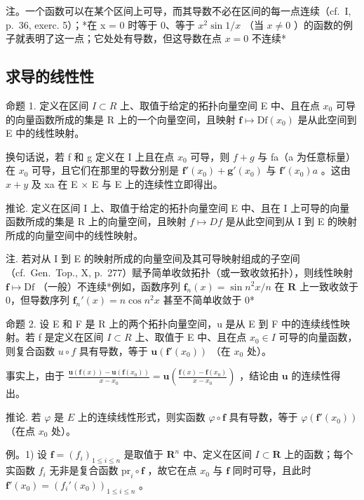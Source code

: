 注。一个函数可以在某个区间上可导，而其导数不必在区间的每一点连续（cf.~I, p.~36, exerc. 5）；*在 x = 0 时等于 0、等于 \(x^{2} \sin 1/x\) （当 \(x \neq 0\) ）的函数的例子就表明了这一点；它处处有导数，但这导数在点 \(x = 0\) 不连续*

\subsection{求导的线性性}

命题 1. 定义在区间 \(I \subset R\) 上、取值于给定的拓扑向量空间 E 中、且在点 \(x_{0}\) 可导的向量函数所成的集是 R 上的一个向量空间，且映射 \(\mathbf{f} \mapsto \mathrm{Df}(x_{0})\) 是从此空间到 E 中的线性映射。

换句话说，若 f 和 g 定义在 I 上且在点 \(x_{0}\) 可导，则 \(f + g\) 与 fa（a 为任意标量）在 \(x_{0}\) 可导，且它们在那里的导数分别是 \(\mathbf{f}'(x_{0}) + \mathbf{g}'(x_{0})\) 与 \(\mathbf{f}'(x_{0})a\) 。这由 \(x + y\) 及 xa 在 E × E 与 E 上的连续性立即得出。

推论. 定义在区间 I 上、取值于给定的拓扑向量空间 E 中、且在 I 上可导的向量函数所成的集是 R 上的向量空间，且映射 \(f \mapsto Df\) 是从此空间到从 I 到 E 的映射所成的向量空间中的线性映射。

注. 若对从 I 到 E 的映射所成的向量空间及其可导映射组成的子空间（cf.~Gen.~Top., X, p.~277）赋予简单收敛拓扑（或一致收敛拓扑），则线性映射 \(\mathbf{f} \mapsto \mathrm{Df}\) （一般）不连续*例如，函数序列 \(\mathbf{f}_n(x) = \sin n^2 x / n\) 在 \(\mathbf{R}\) 上一致收敛于 0，但导数序列 \(\mathbf{f}_n'(x) = n\cos n^2 x\) 甚至不简单收敛于 \(0\)*

命题 2. 设 E 和 F 是 R 上的两个拓扑向量空间，u 是从 E 到 F 中的连续线性映射。若 f 是定义在区间 \(I \subset R\) 上、取值于 E 中、且在点 \(x_{0} \in I\) 可导的向量函数，则复合函数 \(u \circ f\) 具有导数，等于 \(\mathbf{u}(\mathbf{f}'(x_{0}))\) （在 \(x_{0}\) 处）。

事实上，由于 \(\frac{\mathbf{u}(\mathbf{f}(x)) - \mathbf{u}(\mathbf{f}(x_0))}{x - x_0} = \mathbf{u}\left(\frac{\mathbf{f}(x) - \mathbf{f}(x_0)}{x - x_0}\right)\) ，结论由 \(\mathbf{u}\) 的连续性得出。

推论. 若 \(\varphi\) 是 \(E\) 上的连续线性形式，则实函数 \(\varphi \circ \mathbf{f}\) 具有导数，等于 \(\varphi(\mathbf{f}'(x_0))\) （在点 \(x_0\) 处）。

例。1) 设 \(\mathbf{f} = (f_i)_{1\leqslant i\leqslant n}\) 是取值于 \(\mathbf{R}^n\) 中、定义在区间 \(I\subset \mathbf{R}\) 上的函数；每个实函数 \(f_{i}\) 无非是复合函数 \(\mathrm{pr}_i\circ \mathbf{f}\) ，故它在点 \(x_0\) 与 \(\mathbf{f}\) 同时可导，且此时 \(\mathbf{f}'(x_0) = (f_i'(x_0))_{1\leqslant i\leqslant n}\) 。

